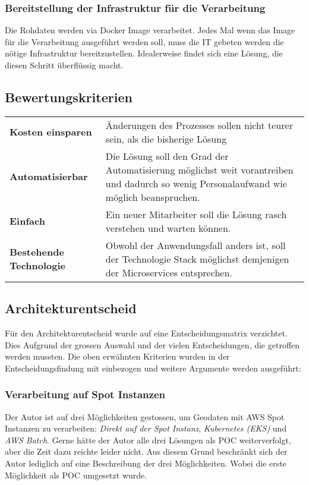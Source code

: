 \subsubsection{Bereitstellung der Infrastruktur für die Verarbeitung}
Die Rohdaten werden via Docker Image verarbeitet. Jedes Mal wenn das Image für die Verarbeitung ausgeführt werden soll, muss die IT gebeten werden die nötige Infrastruktur bereitzustellen. Idealerweise findet sich eine Lösung, die diesen Schritt überflüssig macht.


\subsection{Bewertungskriterien}
\begin{tabular}{p{}p{}}
    \textbf{Kosten einsparen} & Änderungen des Prozesses sollen nicht teurer sein, als die bisherige Lösung\\
    \textbf{Automatisierbar} & Die Lösung soll den Grad der Automatisierung möglichst weit vorantreiben und dadurch so wenig Personalaufwand wie möglich beanspruchen.\\
    \textbf{Einfach} & Ein neuer Mitarbeiter soll die Lösung rasch verstehen und warten können.\\
    \textbf{Bestehende Technologie} & Obwohl der Anwendungsfall anders ist, soll der Technologie Stack möglichst demjenigen der Microservices entsprechen.\\
\end{tabular}

\subsection{Architekturentscheid}
Für den Architekturentscheid wurde auf eine Entscheidungsmatrix verzichtet. Dies Aufgrund der grossen Auswahl und der vielen Entscheidungen, die getroffen werden mussten. Die oben erwähnten Kriterien wurden in der Entscheidungsfindung mit einbezogen und weitere Argumente werden ausgeführt:

\subsubsection{Verarbeitung auf Spot Instanzen}
Der Autor ist auf drei Möglichkeiten gestossen, um Geodaten mit AWS Spot Instanzen zu verarbeiten: \emph{Direkt auf der Spot Instanz}, \emph{Kubernetes (EKS)} und \emph{AWS Batch}. Gerne hätte der Autor alle drei Lösungen als POC weiterverfolgt, aber die Zeit dazu reichte leider nicht. Aus diesem Grund beschränkt sich der Autor lediglich auf eine Beschreibung der drei Möglichkeiten. Wobei die erste Möglichkeit als POC umgesetzt wurde.

